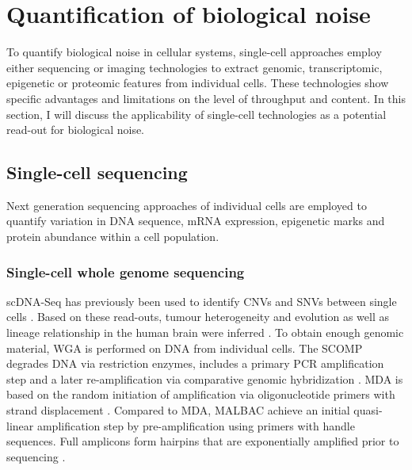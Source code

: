 
\section{Quantification of biological noise} 

To quantify biological noise in cellular systems, single-cell approaches employ either sequencing or imaging technologies to extract genomic, transcriptomic, epigenetic or proteomic features from individual cells. These technologies show specific advantages and limitations on the level of throughput and content. In this section, I will discuss the applicability of single-cell technologies as a potential read-out for biological noise.

\subsection{Single-cell sequencing}

Next generation sequencing approaches of individual cells are employed to quantify variation in DNA sequence, mRNA expression, epigenetic marks and protein abundance within a cell population. 

\subsubsection{Single-cell whole genome sequencing}

\Gls{scDNA-Seq} has previously been used to identify CNVs and SNVs between single cells \citep{Shpunt2012}. Based on these read-outs, tumour heterogeneity and evolution \citep{Navin2011} as well as lineage relationship in the human brain were inferred \citep{Evrony2015}. To obtain enough genomic material, \gls{WGA} is performed on DNA from individual cells. The \gls{SCOMP} degrades DNA via restriction enzymes, includes a primary PCR amplification step and a later re-amplification via comparative genomic hybridization \citep{Klein1999}. \Gls{MDA} is based on the random initiation of amplification via oligonucleotide primers with strand displacement \citep{Dean2002}. Compared to MDA, \gls{MALBAC} achieve an initial quasi-linear amplification step by pre-amplification using primers with handle sequences. Full amplicons form hairpins that are exponentially amplified prior to sequencing \citep{Shpunt2012}. \\


